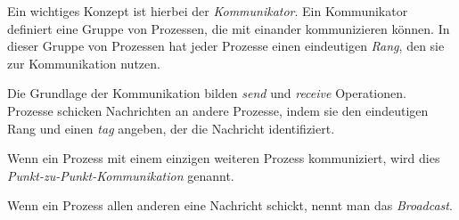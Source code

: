 Ein wichtiges Konzept ist hierbei der \textit{Kommunikator}.
Ein Kommunikator definiert eine Gruppe von Prozessen, die mit einander kommunizieren
können. In dieser Gruppe von Prozessen hat jeder Prozesse einen eindeutigen
\textit{Rang}, den sie zur Kommunikation nutzen.

Die Grundlage der Kommunikation bilden \textit{send} und \textit{receive} Operationen.
Prozesse schicken Nachrichten an andere Prozesse, indem sie den eindeutigen Rang
und einen \textit{tag} angeben, der die Nachricht identifiziert.

Wenn ein Prozess mit einem einzigen weiteren Prozess kommuniziert, wird dies
\textit{Punkt-zu-Punkt-Kommunikation} genannt.

Wenn ein Prozess allen anderen eine Nachricht schickt, nennt man das \textit{Broadcast}.

